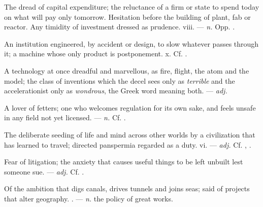  The dread of capital expenditure; the reluctance of a firm or state to spend today on what will pay only tomorrow.   Hesitation before the building of plant, fab or reactor.   Any timidity of investment dressed as prudence.   viii. ---  \textit{n.} Opp. .

 An institution engineered, by accident or design, to slow whatever passes through it; a machine whose only product is postponement.   x. Cf. .

 A technology at once dreadful and marvellous, as fire, flight, the atom and the model; the class of inventions which the decel sees only as \textit{terrible} and the accelerationist only as \textit{wondrous}, the Greek word meaning both. ---  \textit{adj.}

 A lover of fetters; one who welcomes regulation for its own sake, and feels unsafe in any field not yet licensed.  ---  \textit{n.} Cf. .

 The deliberate seeding of life and mind across other worlds by a civilization that has learned to travel; directed panspermia regarded as a duty.   vi. ---  \textit{adj.} Cf. , .

 Fear of litigation; the anxiety that causes useful things to be left unbuilt lest someone sue. ---  \textit{adj.} Cf. .

 Of the ambition that digs canals, drives tunnels and joins seas; said of projects that alter geography. . ---  \textit{n.} the policy of great works.

